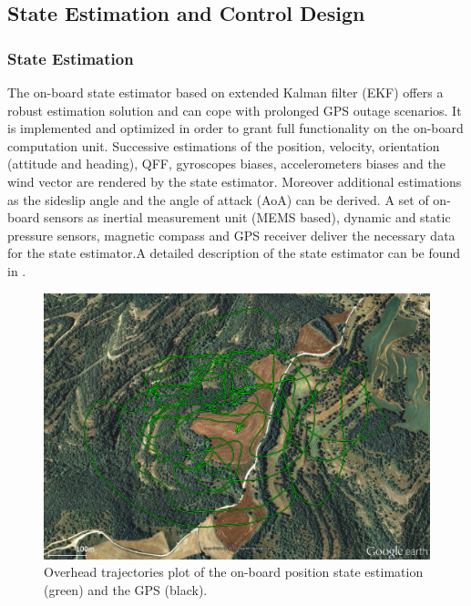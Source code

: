 \subsection{State Estimation and Control Design}

\subsubsection{State Estimation} \label{secsec:StateEstimation}
The on-board state estimator based on extended Kalman filter (EKF) offers a robust estimation solution and can cope with prolonged GPS outage scenarios. It is implemented and optimized in order to grant full functionality on the on-board computation unit. 
Successive estimations of the position, velocity, orientation (attitude and heading), QFF, gyroscopes biases, accelerometers biases and the wind vector are rendered by the state estimator. Moreover additional estimations as the sideslip angle and the angle of attack (AoA) can be derived. A set of on-board sensors as inertial measurement unit (MEMS based), dynamic and static pressure sensors, magnetic compass and GPS receiver deliver the necessary data for the state estimator.A detailed description of the state estimator can be found in  \cite{Leutenegger_MSC2014}.
  
\begin{figure}[tb]
    \centering
    \includegraphics[width=\linewidth]{images/10_real_time_state_estimator_position}
    \caption{Overhead trajectories plot of the on-board position state estimation (green) and the GPS  (black).}
    \label{fig:real_time_state_estimator_positionl}
\end{figure}


